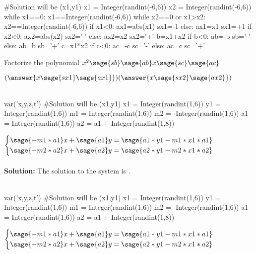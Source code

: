 \documentclass{ximera}
\begin{document}
\begin{shuffle}
\begin{question}
\begin{sagesilent}
#Solution will be (x1,y1)
x1 = Integer(randint(-6,6))
x2 = Integer(randint(-6,6))
while x1==0:
    x1==Integer(randint(-6,6))
while x2==0 or x1>x2:
    x2==Integer(randint(-6,6))
if x1<0:
    ax1=abs(x1)
    sx1=-1
else:
    ax1=x1
    sx1=+1
if x2<0:
    ax2=abs(x2)
    sx2='-'
else:
    ax2=x2
    sx2='+'
b=x1+x2
if b<0:
    ab=-b
    sb='-'
else:
    ab=b
    sb='+'
c=x1*x2
if c<0:
    ac=-c
    sc='-'
else:
    ac=c
    sc='+'
\end{sagesilent}

Factorize the polynomial $x^2\sage{sb}\sage{ab}x\sage{sc}\sage{ac}$


$(\answer{x\sage{sx1}\sage{ax1}})(\answer{x\sage{sx2}\sage{ax2}})$\\\\

\end{question}
\begin{question}
\begin{sagesilent}
var('x,y,z,t')
#Solution will be (x1,y1)
x1 = Integer(randint(1,6))
y1 = Integer(randint(1,6))
m1 = Integer(randint(1,6))
m2 = -Integer(randint(1,6)) 
a1 = Integer(randint(1,6))
a2 = a1 + Integer(randint(1,8))
\end{sagesilent}
$\begin{cases}
\sage{-m1*a1}x+\sage{a1}y=\sage{a1*y1-m1*x1*a1}\\
\sage{-m2*a2}x+\sage{a2}y=\sage{a2*y1-m2*x1*a2}\\
\end{cases}$\\\\

{\bf Solution:} The solution to the system is 
.\\\\
\end{question}

\begin{question}
\begin{sagesilent}
var('x,y,z,t')
#Solution will be (x1,y1)
x1 = Integer(randint(1,6))
y1 = Integer(randint(1,6))
m1 = Integer(randint(1,6))
m2 = -Integer(randint(1,6)) 
a1 = Integer(randint(1,6))
a2 = a1 + Integer(randint(1,8))
\end{sagesilent}
$\begin{cases}
\sage{-m1*a1}x+\sage{a1}y=\sage{a1*y1-m1*x1*a1}\\
\sage{-m2*a2}x+\sage{a2}y=\sage{a2*y1-m2*x1*a2}\\
\end{cases}$\\\\


\end{question}
\end{shuffle}
\end{document}
